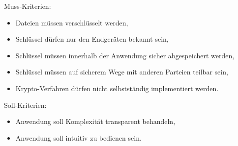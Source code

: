 \documentclass[10pt, a4paper,headsepline]{scrreprt}
\begin{document}
Muss-Kriterien:
\begin{itemize}
\item Dateien müssen verschlüsselt werden,
\item Schlüssel dürfen nur den Endgeräten bekannt sein,
\item Schlüssel müssen innerhalb der Anwendung sicher abgespeichert werden,
\item Schlüssel müssen auf sicherem Wege mit anderen Parteien teilbar sein,
\item Krypto-Verfahren dürfen nicht selbstständig implementiert werden.
\end{itemize}
Soll-Kriterien:
\begin{itemize}
\item Anwendung soll Komplexität transparent behandeln,
\item Anwendung soll intuitiv zu bedienen sein.
\end{itemize}
\end{document}
